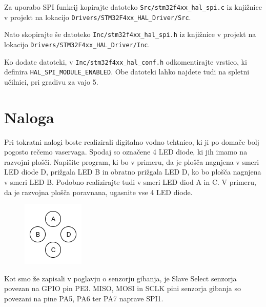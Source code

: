 \documentclass[12pt,letterpaper]{article}
\begin{document}
Za uporabo SPI funkcij kopirajte datoteko \texttt{Src/stm32f4xx\_hal\_spi.c} iz knjižnice v projekt na lokacijo \texttt{Drivers/STM32F4xx\_HAL\_Driver/Src}.

Nato skopirajte še datoteko \texttt{Inc/stm32f4xx\_hal\_spi.h} iz knjižnice v projekt na lokacijo \texttt{Drivers/STM32F4xx\_HAL\_Driver/Inc}.

Ko dodate datoteki, v \texttt{Inc/stm32f4xx\_hal\_conf.h} odkomentirajte vrstico, ki definira \texttt{HAL\_SPI\_MODULE\_ENABLED}. Obe datoteki lahko najdete tudi na spletni učilnici, pri gradivu za vajo 5.

\newpage

\section*{Naloga}

Pri tokratni nalogi boste realizirali digitalno vodno tehtnico, ki ji po domače bolj pogosto rečemo vaservaga. Spodaj so označene 4 LED diode, ki jih imamo na razvojni plošči. Napišite program, ki bo v primeru, da je plošča nagnjena v smeri LED diode D, prižgala LED B in obratno prižgala LED D, ko bo plošča nagnjena v smeri LED B. Podobno realizirajte tudi v smeri LED diod A in C. V primeru, da je razvojna plošča poravnana, ugasnite vse 4 LED diode.

\begin{figure}[ht!]
  \centering
  \includegraphics{images/vaja5/led.png}
  \label{LIS302DL}
\end{figure}

Kot smo že zapisali v poglavju o senzorju gibanja, je Slave Select senzorja povezan na GPIO pin PE3. MISO, MOSI in SCLK pini senzorja gibanja so povezani na pine PA5, PA6 ter PA7 naprave SPI1.
\end{document}

